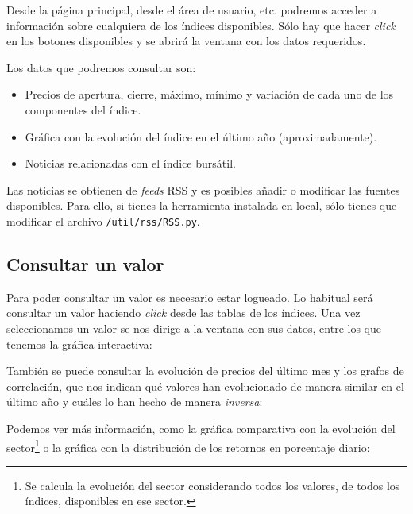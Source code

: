 Desde la página principal, desde el área de usuario, etc. podremos acceder a información sobre cualquiera de los índices disponibles. Sólo hay que hacer \emph{click} en los botones disponibles y se abrirá la ventana con los datos requeridos. 

Los datos que podremos consultar son:

\begin{itemize}
\tightlist
\item
Precios de apertura, cierre, máximo, mínimo y variación de cada uno de los componentes del índice.
\item
Gráfica con la evolución del índice en el último año (aproximadamente).
\item
Noticias relacionadas con el índice bursátil.
\end{itemize}

Las noticias se obtienen de \emph{feeds} RSS y es posibles añadir o modificar las fuentes disponibles. Para ello, si tienes la herramienta instalada en local, sólo tienes que modificar el archivo \texttt{/util/rss/RSS.py}. 



\subsection{Consultar un valor}

Para poder consultar un valor es necesario estar logueado. Lo habitual será consultar un valor haciendo \emph{click} desde las tablas de los índices. Una vez seleccionamos un valor se nos dirige a la ventana con sus datos, entre los que tenemos la gráfica interactiva:



También se puede consultar la evolución de precios del último mes y los grafos de correlación, que nos indican qué valores han evolucionado de manera similar en el último año y cuáles lo han hecho de manera \emph{inversa}:


Podemos ver más información, como la gráfica comparativa con la evolución del sector\footnote{Se calcula la evolución del sector considerando todos los valores, de todos los índices, disponibles en ese sector.} o la gráfica con la distribución de los retornos en porcentaje diario:


